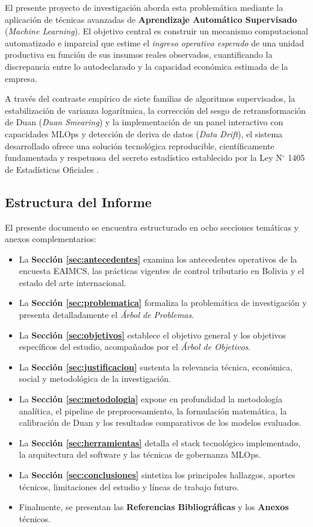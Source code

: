 El presente proyecto de investigación aborda esta problemática mediante la aplicación de técnicas avanzadas de \textbf{Aprendizaje Automático Supervisado} (\textit{Machine Learning}). El objetivo central es construir un mecanismo computacional automatizado e imparcial que estime el \textit{ingreso operativo esperado} de una unidad productiva en función de sus insumos reales observados, cuantificando la discrepancia entre lo autodeclarado y la capacidad económica estimada de la empresa.

A través del contraste empírico de siete familias de algoritmos supervisados, la estabilización de varianza logarítmica, la corrección del sesgo de retransformación de Duan (\textit{Duan Smearing}) y la implementación de un panel interactivo con capacidades MLOps y detección de deriva de datos (\textit{Data Drift}), el sistema desarrollado ofrece una solución tecnológica reproducible, científicamente fundamentada y respetuosa del secreto estadístico establecido por la Ley N$^\circ$ 1405 de Estadísticas Oficiales \citep{ley1405}.

\subsection{Estructura del Informe}
El presente documento se encuentra estructurado en ocho secciones temáticas y anexos complementarios:
\begin{itemize}
    \item La \textbf{Sección \ref{sec:antecedentes}} examina los antecedentes operativos de la encuesta EAIMCS, las prácticas vigentes de control tributario en Bolivia y el estado del arte internacional.
    \item La \textbf{Sección \ref{sec:problematica}} formaliza la problemática de investigación y presenta detalladamente el \textit{Árbol de Problemas}.
    \item La \textbf{Sección \ref{sec:objetivos}} establece el objetivo general y los objetivos específicos del estudio, acompañados por el \textit{Árbol de Objetivos}.
    \item La \textbf{Sección \ref{sec:justificacion}} sustenta la relevancia técnica, económica, social y metodológica de la investigación.
    \item La \textbf{Sección \ref{sec:metodologia}} expone en profundidad la metodología analítica, el pipeline de preprocesamiento, la formulación matemática, la calibración de Duan y los resultados comparativos de los modelos evaluados.
    \item La \textbf{Sección \ref{sec:herramientas}} detalla el stack tecnológico implementado, la arquitectura del software y las técnicas de gobernanza MLOps.
    \item La \textbf{Sección \ref{sec:conclusiones}} sintetiza los principales hallazgos, aportes técnicos, limitaciones del estudio y líneas de trabajo futuro.
    \item Finalmente, se presentan las \textbf{Referencias Bibliográficas} y los \textbf{Anexos} técnicos.
\end{itemize}
